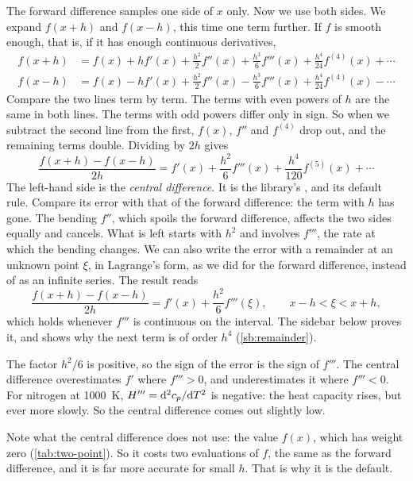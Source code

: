 The forward difference samples one side of $x$ only. Now we use both sides. We expand $f(x + h)$ and $f(x - h)$, this
time one term further. If $f$ is smooth enough, that is, if it has enough continuous derivatives,
\begin{align*}
  f(x + h) &= f(x) + h f'(x) + \frac{h^2}{2} f''(x) + \frac{h^3}{6} f'''(x) + \frac{h^4}{24} f^{(4)}(x) + \cdots\\
  f(x - h) &= f(x) - h f'(x) + \frac{h^2}{2} f''(x) - \frac{h^3}{6} f'''(x) + \frac{h^4}{24} f^{(4)}(x) - \cdots
\end{align*}
Compare the two lines term by term. The terms with even powers of $h$ are the same in both lines. The terms with odd
powers differ only in sign. So when we subtract the second line from the first, $f(x)$, $f''$ and $f^{(4)}$ drop out,
and the remaining terms double. Dividing by $2h$ gives
\begin{equation}
  \frac{f(x + h) - f(x - h)}{2h} = f'(x) + \frac{h^2}{6} f'''(x) + \frac{h^4}{120} f^{(5)}(x) + \cdots
  \label{eq:central}
\end{equation}
The left-hand side is the \emph{central difference}. It is the library's , and its default rule.
Compare its error with that of the forward difference: the term with $h$ has gone. The bending $f''$, which spoils
the forward difference, affects the two sides equally and cancels. What is left starts with $h^2$ and involves
$f'''$, the rate at which the bending changes. We can also write the error with a remainder at an unknown point
$\xi$, in Lagrange's form, as we did for the forward difference, instead of as an infinite series. The result reads
\begin{equation}
  \frac{f(x + h) - f(x - h)}{2h} = f'(x) + \frac{h^2}{6} f'''(\xi), \qquad x - h < \xi < x + h,
  \label{eq:central-error}
\end{equation}
which holds whenever $f'''$ is continuous on the interval. The sidebar below proves it, and shows why the next term
is of order $h^4$ (\cref{sb:remainder}).

The factor $h^2 / 6$ is positive, so the sign of the error is the sign of $f'''$. The central difference
overestimates $f'$ where $f''' > 0$, and underestimates it where $f''' < 0$. For nitrogen at \SI{1000}{\kelvin},
$H''' = \mathrm{d}^2 c_p / \mathrm{d} T^2$ is negative: the heat capacity rises, but ever more slowly. So the central difference
comes out slightly low.

Note what the central difference does not use: the value $f(x)$, which has weight zero (\cref{tab:two-point}). So it
costs two evaluations of $f$, the same as the forward difference, and it is far more accurate for small $h$. That is
why it is the default.

